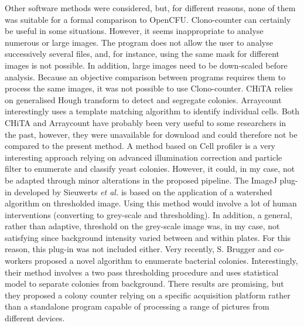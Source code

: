 \documentclass[10pt]{article}
\begin{document}
Other software methods were considered, but, for different reasons,
none of them was suitable for a formal comparison to OpenCFU. 
Clono-counter
\cite{niyazi_counting_2007}
can certainly be useful in some situations. However, it seems inappropriate to analyse numerous or large images.  
The program does not allow the user to analyse successively several files, and, for instance, using
the same mask for different images is not possible.
In addition, large images need to be down-scaled before analysis. 
Because an objective comparison between programs requires them to process the same images,
it was not possible to use Clono-counter.
CHiTA
\cite{bewes_automated_2008}
relies on generalised Hough transform to detect and segregate colonies.
Arraycount
\cite{kachouie_arraycount_2009}
interestingly uses a template matching algorithm to identify individual cells.
Both CHiTA and Arraycount have probably been very useful to some researchers in the past, however,
they were unavailable for download and could therefore not be compared to the present
method.
A method based on Cell profiler
\cite {vokes_using_2008}
is a very interesting approach relying on advanced illumination 
correction and particle filter to enumerate and classify yeast colonies.
However, it could, in my case, not be adapted through minor
alterations in the proposed pipeline.
The ImageJ plug-in developed by Sieuwerts \emph{et al.}
\cite{sieuwerts_simple_2008}
is based on the application of a watershed algorithm on thresholded image.  
Using this method would involve a lot of human
interventions (converting to grey-scale and thresholding).
In addition, a general, rather than adaptive, threshold on the grey-scale image was, in my case, 
not satisfying since background intensity varied between and within plates.
For this reason, this plug-in was not included either.
Very recently, S. Brugger and co-workers
\cite{brugger_automated_2012}
proposed a novel algorithm to enumerate bacterial colonies.
Interestingly, their
method involves a two pass thresholding procedure and uses statistical model
to separate colonies from background. 
There results are promising, but they proposed a colony counter relying on a specific
acquisition platform rather than a standalone program capable of processing a range of 
pictures from different devices.
\end{document}
